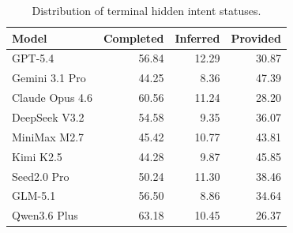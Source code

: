 \begin{table}[h]
\centering
\caption{Distribution of terminal hidden intent statuses.}
\label{tab:hidden_intent_status}
\setlength{\tabcolsep}{8pt}
\begin{tabular}{lrrr}
\toprule[1.25pt]
\textbf{Model} &
\textbf{Completed} &
\textbf{Inferred} &
\textbf{Provided} \\
\midrule[0.75pt]
GPT-5.4 & 56.84 & 12.29 & 30.87 \\
Gemini 3.1 Pro & 44.25 & 8.36 & 47.39 \\
Claude Opus 4.6 & 60.56 & 11.24 & 28.20 \\
DeepSeek V3.2 & 54.58 & 9.35 & 36.07 \\
MiniMax M2.7 & 45.42 & 10.77 & 43.81 \\
Kimi K2.5 & 44.28 & 9.87 & 45.85 \\
Seed2.0 Pro & 50.24 & 11.30 & 38.46 \\
GLM-5.1 & 56.50 & 8.86 & 34.64 \\
Qwen3.6 Plus & 63.18 & 10.45 & 26.37 \\
\bottomrule[1.25pt]
\end{tabular}
\vspace{-4pt}
\end{table}